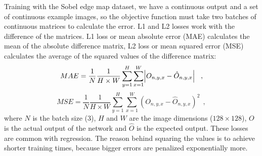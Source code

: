 \documentclass[12pt]{report}
\begin{document}
Training with the Sobel edge map dataset, we have a continuous output and a set of continuous example images, so the objective function must take two batches of continuous matrices to calculate the error. L1 and L2 losses work with the difference of the matrices. L1 loss or mean absolute error (MAE) calculates the mean of the absolute difference matrix, L2 loss or mean squared error (MSE) calculates the average of the squared values of the difference matrix:
\begin{equation*}
MAE = \frac{1}{N}\frac{1}{H\times W}\sum_{y=1}^{H}\sum_{x=1}^{W}\abs{O_{n,y,x}-\hat{O}_{n,y,x}}\ \ ,
\end{equation*}
\begin{equation*}
MSE = \frac{1}{N}\frac{1}{H\times W}\sum_{y=1}^{H}\sum_{x=1}^{W}\left(O_{n,y,x}-\hat{O}_{n,y,x}\right)^{2}\ \ ,
\end{equation*}
where $N$ is the batch size ($3$), $H$ and $W$ are the image dimensions ($128\times128$), $O$ is the actual output of the network and $\hat{O}$ is the expected output. These losses are common with regression. The reason behind squaring the values is to achieve shorter training times, because bigger errors are penalized exponentially more.
\end{document}
